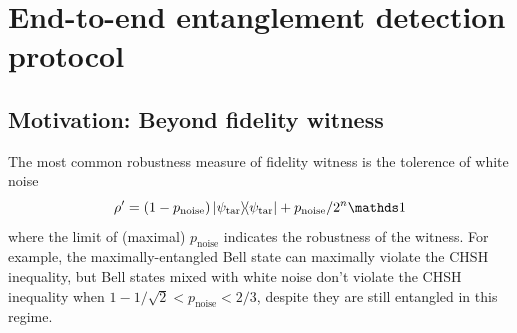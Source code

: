 \documentclass[
aps,
pra,
twocolumn,
floatfix,
]{revtex4-2}
\theoremstyle{plain}
\newtheorem{theorem}{Theorem}
\theoremstyle{definition}
\newtheorem{example}{Example}
\newcommand{\dm}{\rho}
\newcommand{\target}{\textup{tar}}
\newcommand{\noise}{\text{noise}}
\begin{document}
\section{End-to-end entanglement detection protocol}\label{sec:protocol}
\subsection{Motivation: Beyond fidelity witness}
The most common robustness measure of fidelity witness is the tolerence of white noise
\begin{equation}\label{eq:white_noise}
	\dm'
	= (1-p_{\noise}) \op{\psi_{\target}} + p_{\noise}/2^{n} \identity
\end{equation}
where the limit of (maximal) $p_{\noise}$ indicates the robustness of the witness.
For example, the maximally-entangled Bell state can maximally violate the CHSH inequality, 
but Bell states mixed with white noise don't violate the CHSH inequality when $ 1- 1/ \sqrt{2} < p_{\noise}<2/3 $, despite they are still entangled in this regime.
\end{document}
